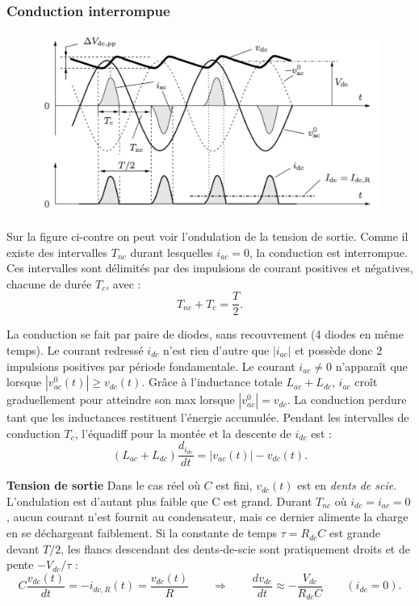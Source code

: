 		\subsubsection{Conduction interrompue}
			\begin{figure}
			\vspace{-5mm}
			\includegraphics[scale=0.3]{ch2/15}
			\end{figure} 
			Sur la figure ci-contre on peut voir l'ondulation de la tension de sortie. Comme il existe des intervalles $T_{nc}$	durant lesquelles $i_{ac} = 0$, la conduction est interrompue. Ces intervalles sont délimités par des impulsions de courant positives et négatives, chacune de durée $T_{c}$, avec :
			\begin{equation}
				T_{nc} + T_c = \frac{T}{2}.
			\end{equation}
			
			La conduction se fait par paire de diodes, sans recouvrement (4 diodes en même temps). Le courant redressé $i_{dc}$ n'est rien d'autre que $|i_{ac}|$ et possède donc 2 impulsions positives par période fondamentale. Le courant $i_{ac} \neq 0$ n'apparaît que lorsque $|v_{ac}^0(t)| \geq v_{dc}(t)$. Grâce à l'inductance totale $L_{ac} + L_{dc}$, $i_{ac}$ croît graduellement pour atteindre son max lorsque $|v_{ac}^0| = v_{dc}$. La conduction perdure tant que les inductances restituent l'énergie accumulée. Pendant les intervalles de conduction $T_c$, l'équadiff pour la montée et la descente de $i_{dc}$ est :
			\begin{equation}
				(L_{ac}+L_{dc})\frac{d_{i_{dc}}}{dt} = |v_{ac}(t)|-v_{dc}(t).
			\end{equation}
			
			\textbf{Tension de sortie} \qquad Dans le cas réel où $C$ est fini, $v_{dc}(t)$ est en \textit{dents de scie}. L'ondulation est d'autant plus faible que C est grand. Durant $T_{nc}$ où $i_{dc} =i_{ac} =0$, aucun courant n'est fournit au condensateur, mais ce dernier alimente la charge en se déchargeant faiblement. Si la constante de temps $\tau = R_{dc}C$ est grande devant $T/2$, les flancs descendant des dents-de-scie sont pratiquement droits et de pente $-V_{dc}/\tau$ : 
			\begin{equation}
				C\frac{v_{dc}(t)}{dt} = -i_{dc,R}(t) = \frac{v_{dc}(t)}{R} \qquad \Rightarrow \qquad \frac{dv_{dc}}{dt} \approx - \frac{V_{dc}}{R_{dc}C} \qquad (i_{dc} = 0).
			\end{equation}
			
